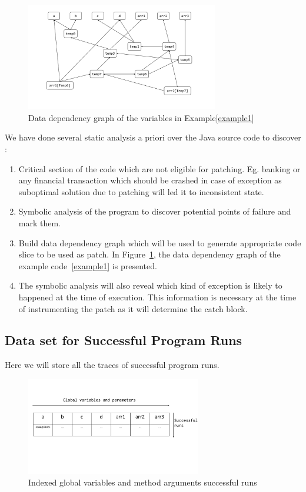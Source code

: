 \begin{figure}[!htb]
\centering
\includegraphics[width=3.3in]{images/depG.pdf}
\caption{Data dependency graph of the variables in Example\ref{example1}}
\label{fig:datadep}
\end{figure}

We have done several  static analysis a priori  over the Java source code to discover :
\begin{enumerate}
\item Critical section of the code which are not eligible for patching. Eg.
banking or any financial transaction which should be crashed in case of
exception as suboptimal solution due to patching will led it to inconsistent
state.
\item Symbolic analysis of the program to discover potential points of failure
and mark them.
\item Build data dependency graph which will be used to generate appropriate
code slice to be used as patch.
In Figure~\ref{fig:datadep}, the data dependency graph of the example
code~\ref{example1} is presented.
\item The symbolic analysis will also reveal which kind of exception is likely
to happened at the time of execution.
This information is necessary at the time of instrumenting the patch as it will
determine the catch block.
	
\end{enumerate}

\subsection{Data set for Successful Program Runs}
\label{subsec:progrun}

Here we will store all the traces of successful program runs.
\begin{figure}[!htb]
\centering
\includegraphics[width=3.0in]{images/succrun.pdf}
\caption{Indexed global variables and method arguments successful runs}
\label{fig:succrun}
\end{figure}

